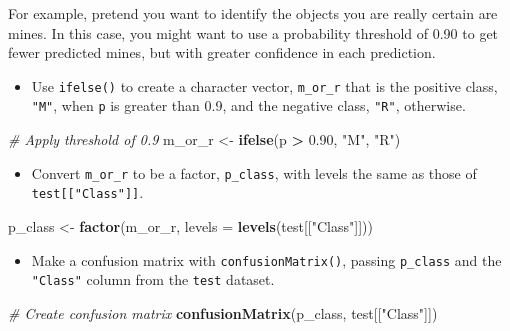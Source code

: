 \documentclass[
]{book}
\newenvironment{Shaded}{\begin{snugshade}}{\end{snugshade}}
\newcommand{\CommentTok}[1]{\textcolor[rgb]{0.56,0.35,0.01}{\textit{#1}}}
\newcommand{\DataTypeTok}[1]{\textcolor[rgb]{0.13,0.29,0.53}{#1}}
\newcommand{\FloatTok}[1]{\textcolor[rgb]{0.00,0.00,0.81}{#1}}
\newcommand{\KeywordTok}[1]{\textcolor[rgb]{0.13,0.29,0.53}{\textbf{#1}}}
\newcommand{\NormalTok}[1]{#1}
\newcommand{\OperatorTok}[1]{\textcolor[rgb]{0.81,0.36,0.00}{\textbf{#1}}}
\newcommand{\StringTok}[1]{\textcolor[rgb]{0.31,0.60,0.02}{#1}}
\providecommand{\tightlist}{%
  \setlength{\itemsep}{0pt}\setlength{\parskip}{0pt}}
\begin{document}
For example, pretend you want to identify the objects you are really certain are mines. In this case, you might want to use a probability threshold of 0.90 to get fewer predicted mines, but with greater confidence in each prediction.

\begin{itemize}
\tightlist
\item
  Use \texttt{ifelse()} to create a character vector, \texttt{m\_or\_r} that is the positive class, \texttt{"M"}, when \texttt{p} is greater than 0.9, and the negative class, \texttt{"R"}, otherwise.
\end{itemize}

\begin{Shaded}
\begin{Highlighting}[]
\CommentTok{# Apply threshold of 0.9}
\NormalTok{m_or_r <-}\StringTok{ }\KeywordTok{ifelse}\NormalTok{(p }\OperatorTok{>}\StringTok{ }\FloatTok{0.90}\NormalTok{, }\StringTok{"M"}\NormalTok{, }\StringTok{"R"}\NormalTok{)}
\end{Highlighting}
\end{Shaded}

\begin{itemize}
\tightlist
\item
  Convert \texttt{m\_or\_r} to be a factor, \texttt{p\_class}, with levels the same as those of \texttt{test{[}{[}"Class"{]}{]}}.
\end{itemize}

\begin{Shaded}
\begin{Highlighting}[]
\NormalTok{p_class <-}\StringTok{ }\KeywordTok{factor}\NormalTok{(m_or_r, }\DataTypeTok{levels =} \KeywordTok{levels}\NormalTok{(test[[}\StringTok{"Class"}\NormalTok{]]))}
\end{Highlighting}
\end{Shaded}

\begin{itemize}
\tightlist
\item
  Make a confusion matrix with \texttt{confusionMatrix()}, passing \texttt{p\_class} and the \texttt{"Class"} column from the \texttt{test} dataset.
\end{itemize}

\begin{Shaded}
\begin{Highlighting}[]
\CommentTok{# Create confusion matrix}
\KeywordTok{confusionMatrix}\NormalTok{(p_class, test[[}\StringTok{"Class"}\NormalTok{]])}
\end{Highlighting}
\end{Shaded}
\end{document}

